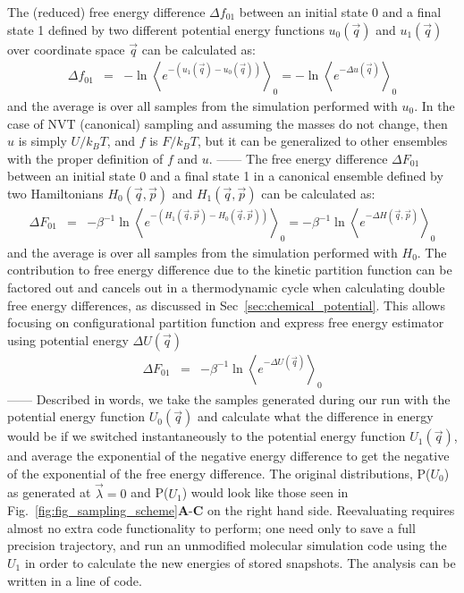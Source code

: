 \documentclass[9pt,bestpractices]{livecoms}
\newcommand{\expect}[1]{\left\langle{#1}\right\rangle}
\begin{document}
The (reduced) free energy difference $\Delta f_{01}$ between an initial state 0 and a final state 1 defined by two different potential energy functions 
$u_0(\vec{q})$ and $u_1(\vec{q})$ over coordinate space $\vec{q}$ can be calculated as:
\begin{eqnarray}
\Delta f_{01} & = & -\ln \expect{e^{-(u_1(\vec{q}) - u_0(\vec{q}))}}_0 =  -\ln \expect{e^{-\Delta u(\vec{q})} }_0
\end{eqnarray}\label{eqn.zwanzig}
and the average is over all samples from the simulation performed with $u_0$. In the case of NVT (canonical) sampling and assuming the masses do not change, then $u$ is simply $U/k_BT$, and $f$ is $F/k_BT$, but it can be generalized to other ensembles with the proper definition of $f$ and $u$.
------
The free energy difference $\Delta F_{01}$ between an initial state 0 and a final state 1 in a canonical ensemble defined by two Hamiltonians $H_0(\vec{q},\vec{p})$ and $H_1(\vec{q},\vec{p})$ can be calculated as:
\begin{eqnarray}
\Delta F_{01} & = & -\beta^{-1}\ln \expect{e^{-(H_1(\vec{q},\vec{p}) - H_0(\vec{q},\vec{p}))}}_0 =  -\beta^{-1}\ln \expect{e^{-\Delta H(\vec{q},\vec{p})} }_0
\end{eqnarray}\label{eqn.zwanzig}
and the average is over all samples from the simulation performed with $H_0$.
The contribution to free energy difference due to the kinetic partition function can be factored out and cancels out in a thermodynamic cycle when calculating double free energy differences, as discussed in Sec~\ref{sec:chemical_potential}.
This allows focusing on configurational partition function and express free energy estimator using potential energy $\Delta U(\vec{q})$
\begin{eqnarray}
\Delta F_{01} & = &  -\beta^{-1}\ln \expect{e^{-\Delta U(\vec{q})} }_0
\end{eqnarray}\label{eqn.zwanzig_configurational}
------
Described in words, we take the samples generated during our run with the potential energy function $U_0(\vec{q})$ and calculate what the difference in energy would be if we switched instantaneously to the potential energy function $U_1(\vec{q})$, and average the exponential of the negative energy difference to get the negative of the exponential of the free energy difference. The original distributions, P($U_0$) as generated at $\vec{\lambda}=0$ and P($U_1$) would look like those seen in Fig.~\ref{fig:fig_sampling_scheme}\textbf{A}-\textbf{C} on the right hand side. Reevaluating requires almost no extra code functionality to perform; one need only to save a full precision trajectory, and run an unmodified molecular simulation code using the $U_1$ in order to calculate the new energies of stored snapshots. The analysis can be written in a line of code.
\end{document}
